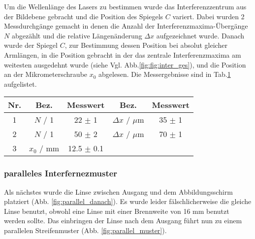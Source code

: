 Um die Wellenlänge des Lasers zu bestimmen wurde das Interferenzzentrum aus der Bildebene gebracht und die Position des Spiegels $C$ variert.
Dabei wurden 2 Messdurchgänge gemacht in denen die Anzahl der Interferenzmaxima-Übergänge $N$ abgezählt und die relative Längenänderung $\Delta x$ aufgezeichnet wurde.
Danach wurde der Spiegel $C$, zur Bestimmung dessen Position bei absolut gleicher Armlängen, in die Position gebracht in der das zentrale Interferenzmaxima am weitesten ausgedehnt wurde (siehe Vgl. Abb.\ref{fig:fig:inter_ges}), und die Position an der Mikrometerschraube $x_0$ abgelesen.
Die Messergebnisse sind in Tab.\ref{tab:inter_konz} aufgelistet.
\begin{table}[H]
    \centering
    \begin{tabular}{|c|cc|cc|} \hline
        Nr. & Bez.          & Messwert          & Bez.                  & Messwert \\\hline \hline
        1   & $N$ / 1       & 22 $\pm$ 1        & $\Delta x$ / $\mu$m   & 35 $\pm$ 1 \\ \hline
        2   & $N$ / 1       & 50 $\pm$ 2        & $\Delta x$ / $\mu$m   & 70 $\pm$ 1 \\ \hline \hline
        3   & $x_0$ / mm    & 12.5 $\pm$ 0.1    &                       &  \\ \hline
    \end{tabular}
    \label{tab:inter_konz}
\end{table}


\subsubsection{paralleles Interfernezmuster}
Als nächstes wurde die Linse zwischen Ausgang und dem Abbildungsschirm platziert (Abb. \ref{fig:parallel_danach}). 
Es wurde leider fälschlicherweise die gleiche Linse benutzt, obwohl eine Linse mit einer Brennweite von 16 mm benutzt werden sollte.
Das einbringen der Linse nach dem Ausgang führt nun zu einem parallelen Streifenmuster (Abb. \ref{fig:parallel_muster}).

